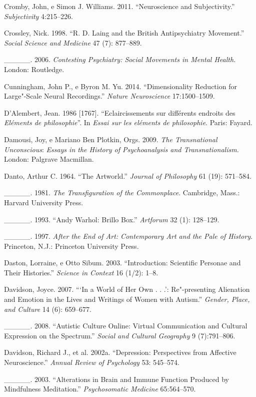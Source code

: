 {\begin{Parskip}
Cromby, John, e Simon J. Williams. 2011. ``Neuroscience and
Subjectivity.'' \emph{Subjectivity} 4:215--226.

Crossley, Nick. 1998. ``R. D. Laing and the British Antipsychiatry
Movement.'' \emph{Social Science and Medicine} 47 (7): 877--889.

\_\_\_\_\_. 2006. \emph{Contesting Psychiatry: Social Movements in Mental
Health.} London: Routledge.

Cunningham, John P., e Byron M. Yu. 2014. ``Dimensionality Reduction for
Large"-Scale Neural Recordings.'' \emph{Nature Neuroscience}
17:1500--1509.

D'Alembert, Jean. 1986 {[}1767{]}. ``Eclaircissements sur différents
endroits des \emph{Eléments de philosophie}''. In \emph{Essai sur les
eléments de philosophie}. Paris: Fayard.

Damousi, Joy, e Mariano Ben Plotkin, Orgs. 2009. \emph{The Transnational
Unconscious}: \emph{Essays in the History of Psychoanalysis and
Transnationalism.} London: Palgrave Macmillan.

Danto, Arthur C. 1964. ``The Artworld.'' \emph{Journal of Philosophy} 61
(19): 571--584.

\_\_\_\_\_. 1981. \emph{The Transfiguration of the Commonplace}.
Cambridge, Mass.: Harvard University Press.

\_\_\_\_\_. 1993. ``Andy Warhol: Brillo Box.'' \emph{Artforum} 32 (1):
128--129.

\_\_\_\_\_. 1997. \emph{After the End of Art: Contemporary Art and the
Pale of History}. Princeton, N.J.: Princeton University Press.

Daston, Lorraine, e Otto Sibum. 2003. ``Introduction: Scientific
Personae and Their Histories.'' \emph{Science in Context} 16 (1/2):
1--8.

Davidson, Joyce. 2007. ```In a World of Her Own . . .': Re"-presenting
Alienation and Emotion in the Lives and Writings of Women with Autism.''
\emph{Gender, Place, and Culture} 14 (6): 659--677.

\_\_\_\_\_. 2008. ``Autistic Culture Online: Virtual Communication and
Cultural Expression on the Spectrum.'' \emph{Social and Cultural
Geography} 9 (7):791--806.

Davidson, Richard J., et al. 2002a. ``Depression: Perspectives from
Affective Neuroscience.'' \emph{Annual Review of Psychology} 53:
545--574.

\_\_\_\_\_. 2003. ``Alterations in Brain and Immune Function Produced by
Mindfulness Meditation.'' \emph{Psychosomatic Medicine} 65:564--570.


\end{Parskip}}
